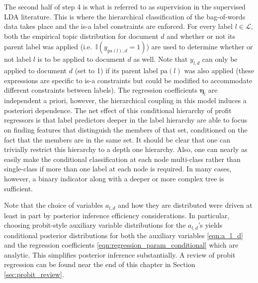 The second half of step 4 is what is referred to as supervision in the supervised LDA literature.  This is where the hierarchical classification of the bag-of-words data takes place and the is-a label constraints are enforced.  For every label $l \in \mathcal{L}$, both the empirical topic distribution for document $d$ and whether or not its parent label was applied (i.e.~$\mathbb{I}(y_{\mathrm{pa}(l),d}=1)$) are used to determine whether or not  label $l$ is to be applied to  document $d$ as well.  Note that $y_{l,d}$ can only be applied to document $d$  (set to 1) if its parent label $\mathrm{pa}(l)$ was also applied (these expressions are specific to is-a constraints but could be modified to accommodate different constraints between labels).  The regression coefficients $\boldsymbol\eta_l$ are independent a priori, however, the hierarchical coupling in this model induces a posteriori dependence.   The net effect of this conditional hierarchy of profit regressors is that label predictors deeper in the label hierarchy are able to focus on finding features that distinguish the members of that set, conditioned on the fact that the members are in the same set.  It should be clear that one can trivially restrict this hierarchy to a depth one hierarchy.  Also, one can nearly as easily make the conditional classification at each node multi-class rather than single-class if more than one label at each node is required.  In many cases, however, a binary indicator along with a deeper or more complex tree is sufficient.

Note that the choice of variables $a_{l,d}$ and how they are distributed were  driven at least in part by posterior inference efficiency considerations.  In particular, choosing probit-style auxiliary variable distributions for the $a_{l,d}$'s  yields conditional posterior distributions for both the auxiliary variables \eqref{eqn:a_l_d} and the regression coefficients \eqref{eqn:regression_param_conditional} which are analytic.  This simplifies posterior inference substantially.  A review of probit regression can be found near the end of this chapter in Section \ref{sec:probit_review}.


